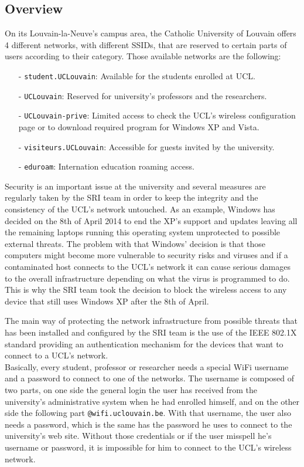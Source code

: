\subsection{Overview}
On its Louvain-la-Neuve's campus area, the Catholic University of Louvain offers 4 different networks, with different SSIDs, that are reserved to certain parts of users according to their category. Those available networks are the following:
\begin{itemize}
	\item[-] \texttt{student.UCLouvain}: Available for the students enrolled at UCL.
	\item[-] \texttt{UCLouvain}: Reserved for university's professors and the researchers.
	\item[-] \texttt{UCLouvain-prive}: Limited access to check the UCL's wireless configuration page or to download required program for Windows XP and Vista.
	\item[-] \texttt{visiteurs.UCLouvain}: Accessible for guests invited by the university.
	\item[-] \texttt{eduroam}: Internation education roaming access.
\end{itemize}

Security is an important issue at the university and several measures are regularly taken by the SRI team in order to keep the integrity and the consistency of the UCL's network untouched. As an example, Windows has decided on the 8th of April 2014 to end the XP's support and updates leaving all the remaining laptops running this operating system unprotected to possible external threats\cite{windows}. The problem with that Windows' decision is that those computers might become more vulnerable to security risks and viruses and if a contaminated host connects to the UCL's network it can cause serious damages to the overall infrastructure depending on what the virus is programmed to do. This is why the SRI team took the decision to block the wireless access to any device that still uses Windows XP after the 8th of April.

The main way of protecting the network infrastructure from possible threats that has been installed and configured by the SRI team is the use of the IEEE 802.1X standard providing an authentication mechanism for the devices that want to connect to a UCL's network.\\
Basically, every student, professor or researcher needs a special WiFi username and a password to connect to one of the networks. The username is composed of two parts, on one side the general login the user has received from the university's administrative system when he had enrolled himself, and on the other side the following part \texttt{@wifi.uclouvain.be}. With that username, the user also needs a password, which is the same has the password he uses to connect to the university's web site. Without those credentials or if the user misspell he's username or password, it is impossible for him to connect to the UCL's wireless network.

